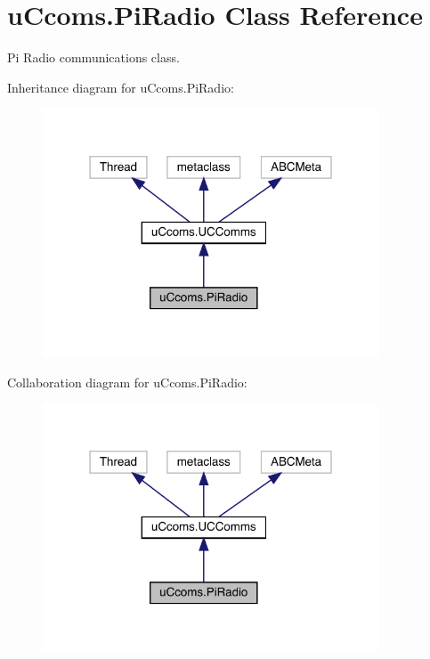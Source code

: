 \hypertarget{classu_ccoms_1_1_pi_radio}{}\section{u\+Ccoms.\+Pi\+Radio Class Reference}
\label{classu_ccoms_1_1_pi_radio}


Pi Radio communications class.  




Inheritance diagram for u\+Ccoms.\+Pi\+Radio\+:\nopagebreak
\begin{figure}[H]
\begin{center}
\leavevmode
\includegraphics[width=283pt]{classu_ccoms_1_1_pi_radio__inherit__graph}
\end{center}
\end{figure}


Collaboration diagram for u\+Ccoms.\+Pi\+Radio\+:\nopagebreak
\begin{figure}[H]
\begin{center}
\leavevmode
\includegraphics[width=283pt]{classu_ccoms_1_1_pi_radio__coll__graph}
\end{center}
\end{figure}
